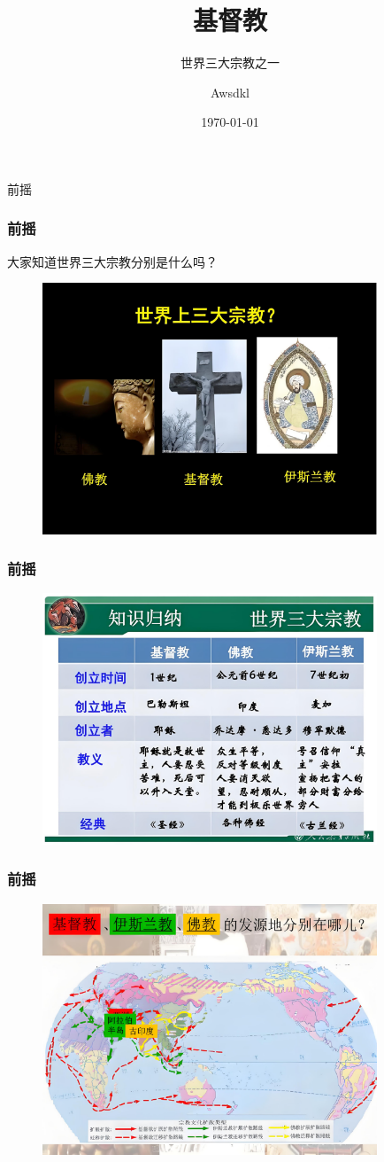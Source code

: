 \documentclass[UTF8]{ctexbeamer}
\title{基督教}
\subtitle{世界三大宗教之一}
\author{Awsdkl}
\date{\today}
\begin{document}
	\begin{frame}{前摇}
		\frametitle{前摇}
		大家知道世界三大宗教分别是什么吗？
		\pause
		\begin{figure}[H]
			\centering
			\includegraphics[width=10cm]{picture/1.png}
		\end{figure}
		\par 
	\end{frame} 
	\begin{frame}
		\frametitle{前摇}
		\begin{figure}[H]
			\centering
			\includegraphics[width=10cm]{picture/2.png}
		\end{figure}
	\end{frame}
	\begin{frame}
		\frametitle{前摇}
		\begin{figure}[H]
			\centering
			\includegraphics[width=10cm]{picture/3.png}
		\end{figure}
	\end{frame}
\end{document}
